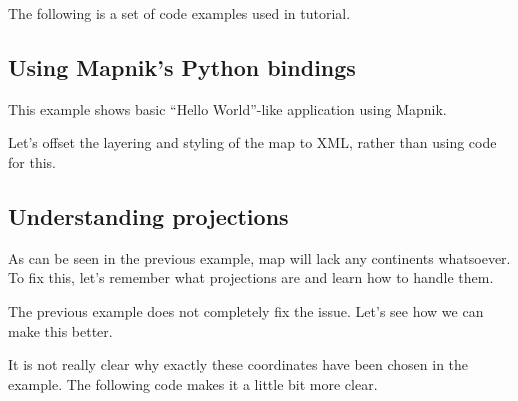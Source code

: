 \documentclass[letterpaper]{article}
\begin{document}
The following is a set of code examples used in tutorial.

\subsection{Using Mapnik's Python bindings}
\label{sec:using-mapniks-python}

This example shows basic ``Hello World''-like application using Mapnik.

\begin{centering}
    
\end{centering}

Let's offset the layering and styling of the map to XML, rather than using code
for this.

\begin{centering}
  
\end{centering}

\begin{centering}
    
\end{centering}

\subsection{Understanding projections}
\label{sec:underst-proj}

As can be seen in the previous example, map will lack any continents
whatsoever. To fix this, let's remember what projections are and
learn how to handle them.

\begin{centering}
    
\end{centering}

The previous example does not completely fix the issue. Let's see
how we can make this better.

\begin{centering}
    
\end{centering}

It is not really clear why exactly these coordinates have been chosen
in the example. The following code makes it a little bit more clear.

\begin{centering}
    
\end{centering}
\end{document}
